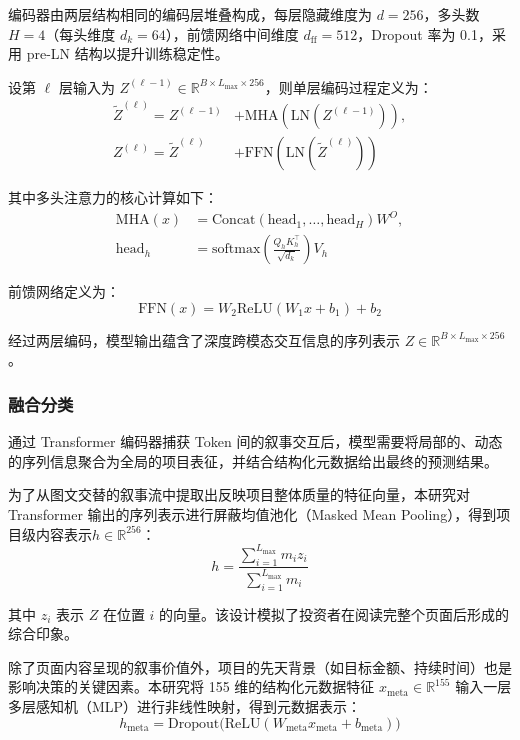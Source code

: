编码器由两层结构相同的编码层堆叠构成，每层隐藏维度为 $ d=256 $，多头数 $ H=4 $（每头维度 $ d_k=64 $），前馈网络中间维度 $ d_{\text{ff}}=512 $，Dropout 率为 0.1，采用 pre-LN 结构以提升训练稳定性。

设第 $ \ell $ 层输入为 $ Z^{(\ell-1)}\in\mathbb{R}^{B\times L_{\max}\times 256} $，则单层编码过程定义为：
\begin{equation}
\begin{aligned}
\tilde{Z}^{(\ell)}=Z^{(\ell-1)}&+\text{MHA}(\text{LN}(Z^{(\ell-1)})), \\
Z^{(\ell)}=\tilde{Z}^{(\ell)}&+\text{FFN}(\text{LN}(\tilde{Z}^{(\ell)}))
\end{aligned}
\end{equation}

其中多头注意力的核心计算如下：
\begin{equation}
\begin{aligned}
\text{MHA}(x)&=\text{Concat}(\text{head}_1,\ldots,\text{head}_H)W^O, \\
\text{head}_h&=\text{softmax}\left(\frac{Q_hK_h^\top}{\sqrt{d_k}}\right)V_h
\end{aligned}
\end{equation}

前馈网络定义为：
\begin{equation}
\text{FFN}(x) = W_2\text{ReLU}(W_1x + b_1) + b_2
\end{equation}

经过两层编码，模型输出蕴含了深度跨模态交互信息的序列表示 $ Z\in\mathbb{R}^{B\times L_{\max}\times 256} $。

\subsubsection{融合分类}

通过 Transformer 编码器捕获 Token 间的叙事交互后，模型需要将局部的、动态的序列信息聚合为全局的项目表征，并结合结构化元数据给出最终的预测结果。

为了从图文交替的叙事流中提取出反映项目整体质量的特征向量，本研究对 Transformer 输出的序列表示进行屏蔽均值池化（Masked Mean Pooling），得到项目级内容表示$ h\in\mathbb{R}^{256} $：
\begin{equation}
h=\frac{\sum_{i=1}^{L_{\max}} m_i z_i}{\sum_{i=1}^{L_{\max}} m_i}
\end{equation}

其中 $ z_i $ 表示 $ Z $ 在位置 $ i $ 的向量。该设计模拟了投资者在阅读完整个页面后形成的综合印象。

除了页面内容呈现的叙事价值外，项目的先天背景（如目标金额、持续时间）也是影响决策的关键因素。本研究将 155 维的结构化元数据特征 $ x_{\text{meta}}\in\mathbb{R}^{155} $ 输入一层多层感知机（MLP）进行非线性映射，得到元数据表示：
\begin{equation}
h_{\text{meta}}=\text{Dropout}\big(\text{ReLU}(W_{\text{meta}}x_{\text{meta}}+b_{\text{meta}})\big)
\end{equation}

